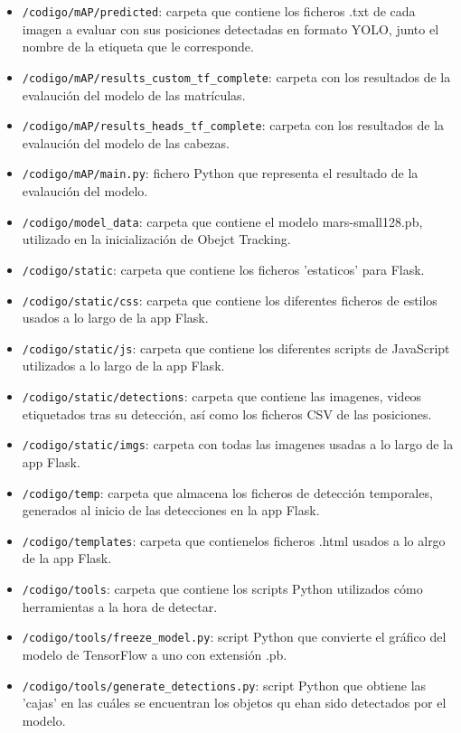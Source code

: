 \begin{itemize}
    \item \texttt{/codigo/mAP/predicted}: carpeta que contiene los ficheros .txt de cada imagen a evaluar con sus posiciones detectadas en formato YOLO, junto el nombre de la etiqueta que le corresponde.
    \item \texttt{/codigo/mAP/results\_custom\_tf\_complete}: carpeta con los resultados de la evalaución del modelo de las matrículas.
    \item \texttt{/codigo/mAP/results\_heads\_tf\_complete}: carpeta con los resultados de la evalaución del modelo de las cabezas.
    \item \texttt{/codigo/mAP/main.py}: fichero Python que representa el resultado de la evalaución del modelo.
    \item \texttt{/codigo/model\_data}: carpeta que contiene el modelo mars-small128.pb, utilizado en la inicialización de Obejct Tracking.
    \item \texttt{/codigo/static}: carpeta que contiene los ficheros 'estaticos' para Flask.
    \item \texttt{/codigo/static/css}: carpeta que contiene los diferentes ficheros de estilos\cite{css} usados a lo largo de la app Flask.
    \item \texttt{/codigo/static/js}: carpeta que contiene los diferentes scripts de JavaScript\cite{js} utilizados a lo largo de la app Flask.
    \item \texttt{/codigo/static/detections}: carpeta que contiene las imagenes, videos etiquetados tras su detección, así como los ficheros CSV de las posiciones.
    \item \texttt{/codigo/static/imgs}: carpeta con todas las imagenes usadas a lo largo de la app Flask.
    \item \texttt{/codigo/temp}: carpeta que almacena los ficheros de detección temporales, generados al inicio de las detecciones en la app Flask.
    \item \texttt{/codigo/templates}: carpeta que contienelos ficheros .html usados a lo alrgo de la app Flask.
    \item \texttt{/codigo/tools}: carpeta que contiene los scripts Python utilizados cómo herramientas a la hora de detectar.
    \item \texttt{/codigo/tools/freeze\_model.py}: script Python que convierte el gráfico del modelo de TensorFlow a uno con extensión .pb.
    \item \texttt{/codigo/tools/generate\_detections.py}: script Python que obtiene las 'cajas' en las cuáles se encuentran los objetos qu ehan sido detectados por el modelo.

\end{itemize}
